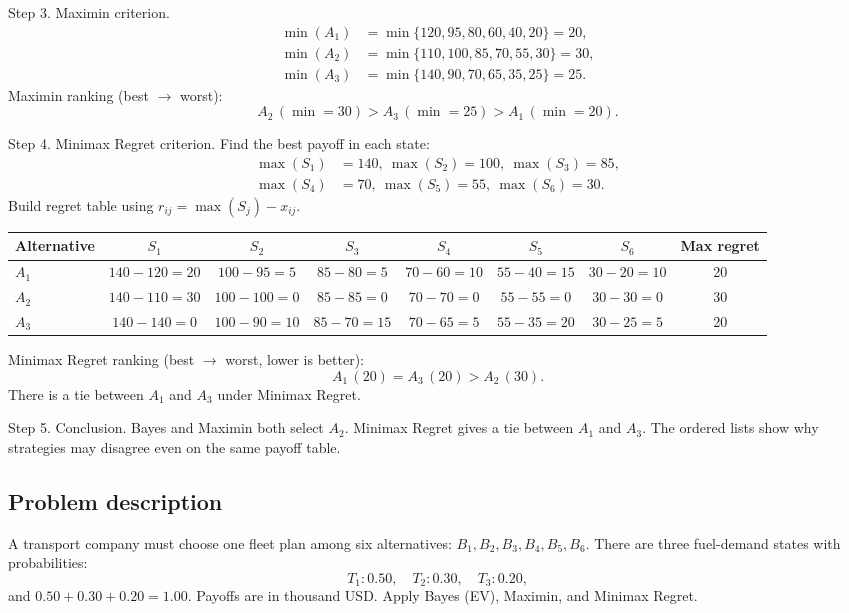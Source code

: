 \begin{ExamProblems}
		Step 3. Maximin criterion.
		\[
		\begin{aligned}
		\min(A_1)&=\min\{120,95,80,60,40,20\}=20,\\
		\min(A_2)&=\min\{110,100,85,70,55,30\}=30,\\
		\min(A_3)&=\min\{140,90,70,65,35,25\}=25.
		\end{aligned}
		\]
		Maximin ranking (best $\to$ worst):
		\[
		A_2\,(\min=30) > A_3\,(\min=25) > A_1\,(\min=20).
		\]

		Step 4. Minimax Regret criterion.
		Find the best payoff in each state:
		\[
		\begin{aligned}
		\max(S_1)&=140,\ \max(S_2)=100,\ \max(S_3)=85,\\
		\max(S_4)&=70,\ \max(S_5)=55,\ \max(S_6)=30.
		\end{aligned}
		\]
		Build regret table using $r_{ij}=\max(S_j)-x_{ij}$.
		\begin{center}
			\begin{tabular}{l c c c c c c c}
				\toprule
				Alternative & $S_1$ & $S_2$ & $S_3$ & $S_4$ & $S_5$ & $S_6$ & Max regret \\
				\midrule
				$A_1$ & $140-120=20$ & $100-95=5$ & $85-80=5$ & $70-60=10$ & $55-40=15$ & $30-20=10$ & 20 \\
				$A_2$ & $140-110=30$ & $100-100=0$ & $85-85=0$ & $70-70=0$ & $55-55=0$ & $30-30=0$ & 30 \\
				$A_3$ & $140-140=0$ & $100-90=10$ & $85-70=15$ & $70-65=5$ & $55-35=20$ & $30-25=5$ & 20 \\
				\bottomrule
			\end{tabular}
		\end{center}
		Minimax Regret ranking (best $\to$ worst, lower is better):
		\[
		A_1\,(20)=A_3\,(20) > A_2\,(30).
		\]
		There is a tie between $A_1$ and $A_3$ under Minimax Regret.

		Step 5. Conclusion.
		Bayes and Maximin both select $A_2$.
		Minimax Regret gives a tie between $A_1$ and $A_3$.
		The ordered lists show why strategies may disagree even on the same payoff table.

		\newpage
		\item
		\subsection*{Problem description}
		A transport company must choose one fleet plan among six alternatives: $B_1,B_2,B_3,B_4,B_5,B_6$.
		There are three fuel-demand states with probabilities:
		\[
		T_1:0.50,\quad T_2:0.30,\quad T_3:0.20,
		\]
		and $0.50+0.30+0.20=1.00$.
		Payoffs are in thousand USD. Apply Bayes (EV), Maximin, and Minimax Regret.


\end{ExamProblems}

